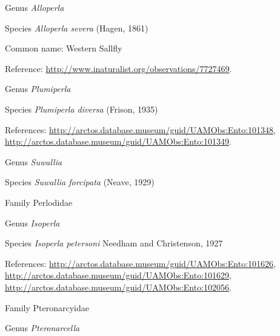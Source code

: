 \documentclass[9pt, article]{memoir}
\begin{document}
\begin{multicols}{2}
\vspace{6pt}\noindent\hspace{30pt}Genus \textit{Alloperla}


\vspace{6pt}\noindent\hspace{36pt}Species \textit{Alloperla severa} (Hagen, 1861)


Common name: Western Sallfly

Reference: 
\url{http://www.inaturalist.org/observations/7727469}.

\vspace{6pt}\noindent\hspace{30pt}Genus \textit{Plumiperla}


\vspace{6pt}\noindent\hspace{36pt}Species \textit{Plumiperla diversa} (Frison, 1935)


References: 
\url{http://arctos.database.museum/guid/UAMObs:Ento:101348}, 
\url{http://arctos.database.museum/guid/UAMObs:Ento:101349}.

\vspace{6pt}\noindent\hspace{30pt}Genus \textit{Suwallia}


\vspace{6pt}\noindent\hspace{36pt}Species \textit{Suwallia forcipata} (Neave, 1929)


\vspace{6pt}\noindent\hspace{24pt}Family Perlodidae


\vspace{6pt}\noindent\hspace{30pt}Genus \textit{Isoperla}


\vspace{6pt}\noindent\hspace{36pt}Species \textit{Isoperla petersoni} Needham and Christenson, 1927


References: 
\url{http://arctos.database.museum/guid/UAMObs:Ento:101626}, 
\url{http://arctos.database.museum/guid/UAMObs:Ento:101629}, 
\url{http://arctos.database.museum/guid/UAMObs:Ento:102056}.

\vspace{6pt}\noindent\hspace{24pt}Family Pteronarcyidae


\vspace{6pt}\noindent\hspace{30pt}Genus \textit{Pteronarcella}



\end{multicols}
\end{document}
